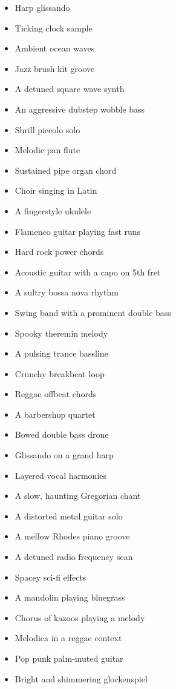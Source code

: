 \documentclass[
  a4paper,  %
  twoside,  %
  bibliography=totoc,
  headsepline,
  cleardoublepage=empty,
  parskip=half,
  draft=false
]{scrbook}
\begin{document}
\begin{multicols}{4}
\begin{itemize}
    \item Harp glissando
    \item Ticking clock sample
    \item Ambient ocean waves
    \item Jazz brush kit groove
    \item A detuned square wave synth
    \item An aggressive dubstep wobble bass
    \item Shrill piccolo solo
    \item Melodic pan flute
    \item Sustained pipe organ chord
    \item Choir singing in Latin
    \item A fingerstyle ukulele
    \item Flamenco guitar playing fast runs
    \item Hard rock power chords
    \item Acoustic guitar with a capo on 5th fret
    \item A sultry bossa nova rhythm
    \item Swing band with a prominent double bass
    \item Spooky theremin melody
    \item A pulsing trance bassline
    \item Crunchy breakbeat loop
    \item Reggae offbeat chords
    \item A barbershop quartet
    \item Bowed double bass drone
    \item Glissando on a grand harp
    \item Layered vocal harmonies
    \item A slow, haunting Gregorian chant
    \item A distorted metal guitar solo
    \item A mellow Rhodes piano groove
    \item A detuned radio frequency scan
    \item Spacey sci-fi effects
    \item A mandolin playing bluegrass
    \item Chorus of kazoos playing a melody
    \item Melodica in a reggae context
    \item Pop punk palm-muted guitar
    \item Bright and shimmering glockenspiel

\end{itemize}
\end{multicols}
\end{document}
